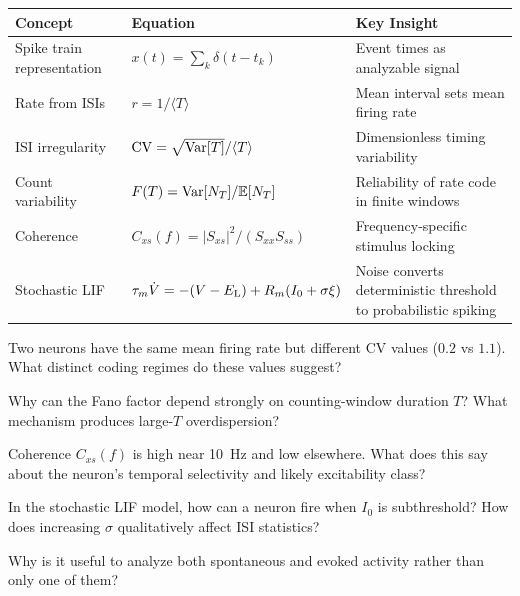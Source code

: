 \begin{chaptersummary}

\begin{center}
\renewcommand{\arraystretch}{1.6}
\begin{tabularx}{\textwidth}{@{}l X X@{}}
  \toprule
  \textbf{Concept} & \textbf{Equation} & \textbf{Key Insight} \\
  \midrule
  Spike train representation &
  $x(t)=\sum_k \delta(t-t_k)$ &
  Event times as analyzable signal \\
  Rate from ISIs &
  $r = 1/\langle T\rangle$ &
  Mean interval sets mean firing rate \\
  ISI irregularity &
  $\mathrm{CV}=\sqrt{\operatorname{Var}[T]}/\langle T\rangle$ &
  Dimensionless timing variability \\
  Count variability &
  $F(T)=\operatorname{Var}[N_T]/\mathbb{E}[N_T]$ &
  Reliability of rate code in finite windows \\
  Coherence &
  $C_{xs}(f)=|S_{xs}|^2/(S_{xx}S_{ss})$ &
  Frequency-specific stimulus locking \\
  Stochastic LIF &
  $\tau_m\dot V=-(V-E_{\mathrm{L}})+R_m(I_0+\sigma\xi)$ &
  Noise converts deterministic threshold to probabilistic spiking \\
  \bottomrule
\end{tabularx}
\end{center}

\end{chaptersummary}

\begin{conceptquestions}
  \item Two neurons have the same mean firing rate but different CV values ($0.2$ vs $1.1$). What distinct coding regimes do these values suggest?

  \item Why can the Fano factor depend strongly on counting-window duration $T$? What mechanism produces large-$T$ overdispersion?

  \item Coherence $C_{xs}(f)$ is high near 10~Hz and low elsewhere. What does this say about the neuron's temporal selectivity and likely excitability class?

  \item In the stochastic LIF model, how can a neuron fire when $I_0$ is subthreshold? How does increasing $\sigma$ qualitatively affect ISI statistics?

  \item Why is it useful to analyze both spontaneous and evoked activity rather than only one of them?
\end{conceptquestions}
